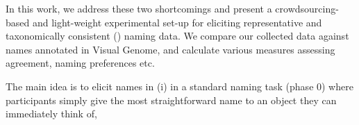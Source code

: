 In this work, we address these two shortcomings and present a crowdsourcing-based and light-weight experimental set-up for eliciting representative and taxonomically consistent () naming data. We compare our collected data against names annotated in Visual Genome, and calculate various measures assessing agreement, naming preferences etc.

The main idea is to elicit names in (i) in a standard naming task (phase 0) where participants simply give the most straightforward name to an object they can immediately think of, 



